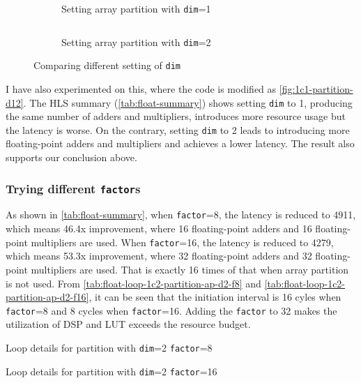 \begin{figure}[ht!]
    \begin{subfigure}[b]{\textwidth}
        \inputminted[firstline=3]{diff}{program/1c1-partition-ap-d1-f2.diff}
        \caption{Setting array partition with \texttt{dim}=1}
        \label{fig:1c1-partition-ap-d1-f2.diff}
    \end{subfigure}
    \begin{subfigure}[b]{\textwidth}
        \inputminted[firstline=3]{diff}{program/1c1-partition-ap-d2-f2.diff}
        \caption{Setting array partition with \texttt{dim}=2}
        \label{fig:1c1-partition-ap-d2-f2.diff}
    \end{subfigure}
    \caption{Comparing different setting of \texttt{dim}}\label{fig:1c1-partition-d12}
\end{figure}

I have also experimented on this, where the code is modified as \autoref{fig:1c1-partition-d12}.
The HLS summary (\autoref{tab:float-summary}) shows setting \texttt{dim} to 1, producing the same number of adders and multipliers, introduces more resource usage but the latency is worse.
On the contrary, setting \texttt{dim} to 2 leads to introducing more floating-point adders and multipliers and achieves a lower latency.
The result also supports our conclusion above.

\subsubsection{Trying different \texttt{factor}s}\label{sec:1cFac}

As shown in \autoref{tab:float-summary}, when \texttt{factor}=8, the latency is reduced to 4911, which means 46.4x improvement, where 16 floating-point adders and 16 floating-point multipliers are used.
When \texttt{factor}=16, the latency is reduced to 4279, which means 53.3x improvement, where 32 floating-point adders and 32 floating-point multipliers are used.
That is exactly 16 times of that when array partition is not used.
From \autoref{tab:float-loop-1c2-partition-ap-d2-f8} and \autoref{tab:float-loop-1c2-partition-ap-d2-f16}, it can be seen that the initiation interval is 16 cyles when \texttt{factor}=8 and 8 cycles when \texttt{factor}=16.
Adding the \texttt{factor} to 32 makes the utilization of DSP and LUT exceeds the resource budget.

\begin{table}[ht!]
    \caption{Loop details for partition with \texttt{dim}=2 \texttt{factor}=8}
    \label{tab:float-loop-1c2-partition-ap-d2-f8}
    \centering
    
\end{table}

\begin{table}[ht!]
    \caption{Loop details for partition with \texttt{dim}=2 \texttt{factor}=16}
    \label{tab:float-loop-1c2-partition-ap-d2-f16}
    \centering
    
\end{table}
